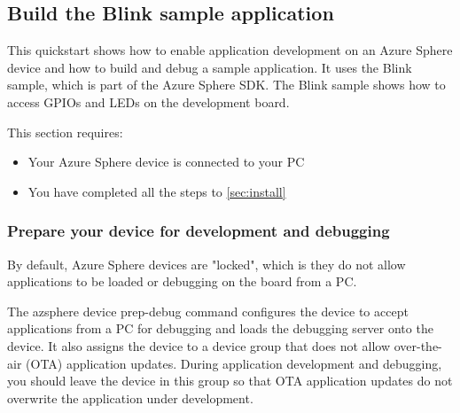 \subsection{Build the Blink sample application}
This quickstart shows how to enable application development on an Azure Sphere device and how to build and debug a sample application. It uses the Blink sample, which is part of the Azure Sphere SDK. The Blink sample shows how to access GPIOs and LEDs on the development board.

This section requires:
\begin{itemize}
    \item Your Azure Sphere device is connected to your PC
    \item You have completed all the steps to \autoref{sec:install}
\end{itemize}

\subsubsection{Prepare your device for development and debugging}
By default, Azure Sphere devices are "locked", which is they do not allow applications to be loaded or debugging on the board from a PC.

The azsphere device prep-debug command configures the device to accept applications from a PC for debugging and loads the debugging server onto the device. It also assigns the device to a device group that does not allow over-the-air (OTA) application updates. During application development and debugging, you should leave the device in this group so that OTA application updates do not overwrite the application under development.

